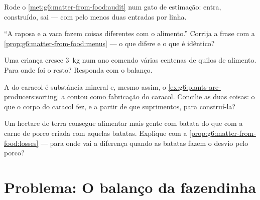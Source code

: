 \begin{exercise}[$\star\star$]\label{exo:g6:matter-from-food:8}
Rode o \cref{met:g6:matter-from-food:audit} num gato de estimação:
entra, construído, sai --- com pelo menos duas entradas por linha.
\end{exercise}

\begin{exercise}[$\star\star$]\label{exo:g6:matter-from-food:9}
``A raposa e a vaca fazem coisas diferentes com o alimento.'' Corrija
a frase com a \cref{prop:g6:matter-from-food:menus} --- o que difere
e o que é idêntico?
\end{exercise}

\begin{exercise}[$\star\star$]\label{exo:g6:matter-from-food:10}
Uma criança cresce \qty{3}{kg} num ano comendo várias centenas de
quilos de alimento. Para onde foi o resto? Responda com o balanço.
\end{exercise}

\begin{exercise}[$\star\star$]\label{exo:g6:matter-from-food:11}
A  do caracol é substância mineral e, mesmo assim, o
\cref{ex:g6:plants-are-producers:sorting} a contou como fabricação do
caracol. Concilie as duas coisas: o que o corpo do caracol fez, e a
partir de que suprimentos, para construí-la?
\end{exercise}

\begin{exercise}[$\star\star\star$]\label{exo:g6:matter-from-food:12}
Um hectare de terra consegue alimentar mais gente com batata do que
com a carne de porco criada com aquelas batatas. Explique com a
\cref{prop:g6:matter-from-food:losses} --- para onde vai a diferença
quando as batatas fazem o desvio pelo porco?
\end{exercise}

\section{Problema: O balanço da fazendinha}


